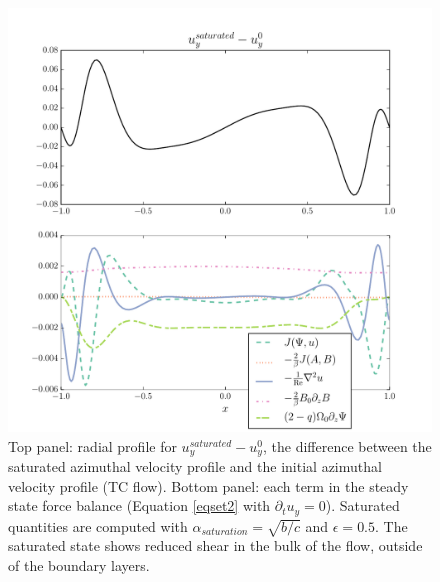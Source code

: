 \documentclass[twocolumn]{aastex61}
\begin{document}
\begin{figure}
\centering
\includegraphics[width=\columnwidth]{thingap_saturation_mechanism_plots_velocity_slice60.pdf}
\caption{Top panel: radial profile for $u_y^{saturated} - u_y^0$, the difference between the saturated azimuthal velocity profile and the initial azimuthal velocity profile (TC flow). Bottom panel: each term in the steady state force balance (Equation \ref{eqset2} with $\partial_t u_{y} = 0$). Saturated quantities are computed with $\alpha_{saturation} = \sqrt{b/c}$ and $\epsilon = 0.5$. The saturated state shows reduced shear in the bulk of the flow, outside of the boundary layers.} \label{fig:sat_comp_vel}
\end{figure}
\end{document}
